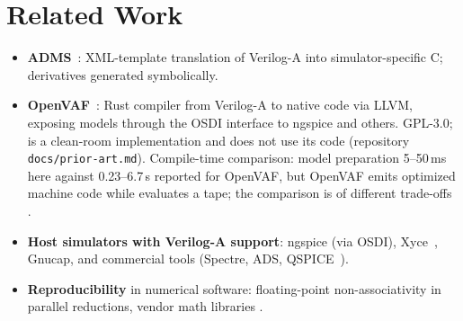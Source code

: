 \section{Related Work}
\label{sec:related}

\begin{itemize}
  \item \textbf{ADMS}~\cite{lemaitre2002adms}: XML-template translation of Verilog-A into
  simulator-specific C; derivatives generated symbolically.
  \item \textbf{OpenVAF}~\cite{openvaf}: Rust compiler from Verilog-A to native code via LLVM,
  exposing models through the OSDI interface to ngspice and others. GPL-3.0; \vas{} is a
  clean-room implementation and does not use its code (repository \texttt{docs/prior-art.md}).
  Compile-time comparison: model preparation 5--50\,ms here against 0.23--6.7\,s reported for
  OpenVAF, but OpenVAF emits optimized machine code while \vas{} evaluates a tape; the
  comparison is of different trade-offs .
  \item \textbf{Host simulators with Verilog-A support}: ngspice (via OSDI), Xyce~\cite{xyce},
  Gnucap, and commercial tools (Spectre, ADS, QSPICE~\cite{qspice}).
  \item \textbf{Reproducibility} in numerical software: floating-point non-associativity in
  parallel reductions, vendor math libraries .
\end{itemize}
